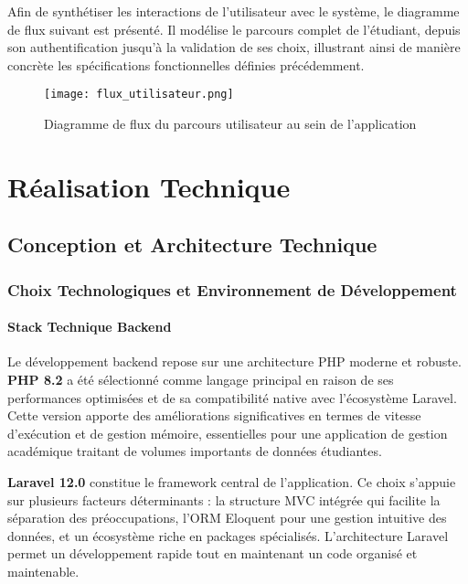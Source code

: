 \documentclass[12pt,a4paper]{report}
\begin{document}
Afin de synthétiser les interactions de l'utilisateur avec le système, le diagramme de flux suivant est présenté. Il modélise le parcours complet de l'étudiant, depuis son authentification jusqu'à la validation de ses choix, illustrant ainsi de manière concrète les spécifications fonctionnelles définies précédemment.

\begin{figure}[h!]
    \centering
    \texttt{[image: flux\_utilisateur.png]}
    \caption{Diagramme de flux du parcours utilisateur au sein de l'application}
    \label{fig:flux_utilisateur}
\end{figure}

\part{Réalisation Technique}

\chapter{Conception et Architecture Technique}

\section{Choix Technologiques et Environnement de Développement}

\subsection{Stack Technique Backend}

Le développement backend repose sur une architecture PHP moderne et robuste. \textbf{PHP 8.2} a été sélectionné comme langage principal en raison de ses performances optimisées et de sa compatibilité native avec l'écosystème Laravel. Cette version apporte des améliorations significatives en termes de vitesse d'exécution et de gestion mémoire, essentielles pour une application de gestion académique traitant de volumes importants de données étudiantes.

\textbf{Laravel 12.0} constitue le framework central de l'application. Ce choix s'appuie sur plusieurs facteurs déterminants : la structure MVC intégrée qui facilite la séparation des préoccupations, l'ORM Eloquent pour une gestion intuitive des données, et un écosystème riche en packages spécialisés. L'architecture Laravel permet un développement rapide tout en maintenant un code organisé et maintenable.
\end{document}
